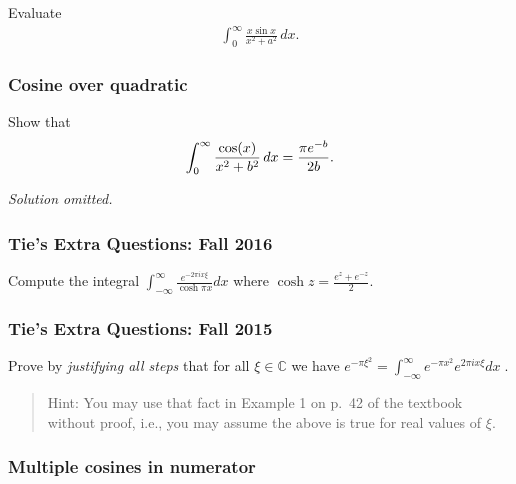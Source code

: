 Evaluate
\begin{align*}\displaystyle{ \int_{0}^{\infty}\frac{x\sin x}{x^2+a^2} \,
dx }.\end{align*}

\hypertarget{cosine-over-quadratic}{%
\subsubsection{Cosine over quadratic}\label{cosine-over-quadratic}}

\begin{problem}[?]

Show that
\begin{align*}
\int_0^{\infty} {\cos(x) \over x^2 + b^2}\,dx= {\pi e^{-b} \over 2b}
.\end{align*}

\end{problem}

\emph{Solution omitted.}

\hypertarget{ties-extra-questions-fall-2016-1}{%
\subsubsection{Tie's Extra Questions: Fall
2016}\label{ties-extra-questions-fall-2016-1}}

Compute the integral
\(\displaystyle{\int_{-\infty}^{\infty} \frac{e^{-2\pi ix\xi}}{\cosh\pi x}dx}\)
where \(\displaystyle{\cosh z=\frac{e^{z}+e^{-z}}{2}}\).

\hypertarget{ties-extra-questions-fall-2015-1}{%
\subsubsection{Tie's Extra Questions: Fall
2015}\label{ties-extra-questions-fall-2015-1}}

Prove by \emph{justifying all steps} that for all
\(\xi \in {\mathbb C}\) we have
\(\displaystyle e^{- \pi \xi^2} = \int_{- \infty}^\infty e^{- \pi x^2} e^{2 \pi i x \xi} dx \; .\)

\begin{quote}
Hint: You may use that fact in Example 1 on p.~42 of the textbook
without proof, i.e., you may assume the above is true for real values of
\(\xi\).
\end{quote}

\hypertarget{multiple-cosines-in-numerator}{%
\subsubsection{Multiple cosines in
numerator}\label{multiple-cosines-in-numerator}}

